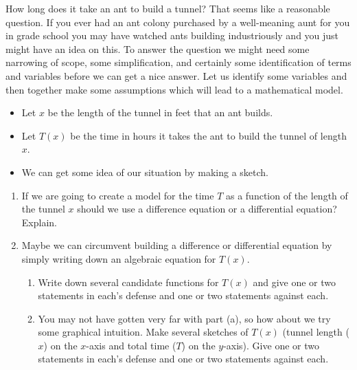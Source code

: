         \begin{lab}
How long does it take an ant to build a tunnel? That seems like a reasonable question. If you ever had an ant colony purchased by a well-meaning aunt for you in grade school you may have watched ants building industriously and you just might have an idea on this.  To answer the question we  might need some narrowing of scope, some simplification, and certainly some identification of terms and variables  before we can get a nice answer. Let us identify some variables and then together make some assumptions which will lead to a mathematical model.

\begin{itemize}
    \item Let $x$ be the length of the tunnel in feet that an ant builds.

    \item  Let $T(x)$ be the time in hours it takes the ant to build the tunnel of length $x$. 

    \item  We can get some idea of our situation by making a sketch.
\end{itemize}


% 

\begin{enumerate}
    \item If we are going to create a model for the time $T$ as a function of the length
        of the tunnel $x$ should we use a difference equation or a differential equation?
        Explain.

    \item Maybe we can circumvent building a difference or differential equation by simply
        writing down an algebraic equation for $T(x)$.  
        \begin{enumerate}
            \item Write down several candidate
        functions for $T(x)$ and give one or two statements in each's defense and one or
        two statements against each.
    \item You may not have gotten very far with part (a), so how about we try some
        graphical intuition.  Make several sketches of $T(x)$ (tunnel length ($x$) on the
        $x$-axis and total time ($T$) on the $y$-axis).  Give one or two statements in
        each's defense and one or two statements against each.
\end{enumerate}


\end{enumerate}
\end{lab}

